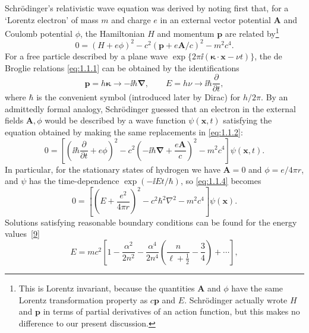 Schr\"odinger's relativistic wave equation was derived by noting first
that, for a `Lorentz electron' of mass $m$ and charge $e$ in an external vector
potential $\mathbf{A}$ and Coulomb potential $\phi$, the Hamiltonian $H$ and momentum
$\mathbf{p}$ are related by\footnote{This is Lorentz invariant, because the quantities $\mathbf{A}$ and $\phi$ have the same Lorentz transformation property as $c\mathbf{p}$ and $E$. Schr\"odinger actually wrote $H$ and $\mathbf{p}$ in terms of partial derivatives of an action function, but this makes no difference to our present discussion.}
\begin{equation}
  0=(H+e\phi)^2-c^2(\mathbf{p}+e\mathbf{A}/c)^2-m^2c^4.
  \tag{1.1.2}\label{eq:1.1.2}
\end{equation}
For a free particle described by a plane wave
$\exp\{2\pi \ii(\boldsymbol{\kappa}\cdot\mathbf{x}-\nu t)\}$, the de
Broglie relations \eqref{eq:1.1.1} can be obtained by the identifications
\begin{equation}
  \mathbf{p}=h\boldsymbol{\kappa}\longrightarrow-\ii\hbar\boldsymbol{\nabla},
  \qquad
  E=h\nu\longrightarrow \ii\hbar\frac{\partial}{\partial t},
  \tag{1.1.3}\label{eq:1.1.3}
\end{equation}
where $\hbar$ is the convenient symbol (introduced later by Dirac) for $h/2\pi$.
By an admittedly formal analogy, Schr\"odinger guessed that an electron
in the external fields $\mathbf{A},\phi$ would be described by a wave function $\psi(\mathbf{x},t)$
satisfying the equation obtained by making the same replacements in
\eqref{eq:1.1.2}:
\begin{equation}
  0=\left[\left(\ii\hbar\frac{\partial}{\partial t}+e\phi\right)^2
  -c^2\left(-\ii\hbar\boldsymbol{\nabla}+\frac{e\mathbf{A}}{c}\right)^2
  -m^2c^4\right]\psi(\mathbf{x},t).
  \tag{1.1.4}\label{eq:1.1.4}
\end{equation}
In particular, for the stationary states of hydrogen we have $\mathbf{A}=0$ and
$\phi=e/4\pi r$, and $\psi$ has the time-dependence $\exp(-\ii Et/\hbar)$, so \eqref{eq:1.1.4} becomes
\begin{equation}
  0=\left[\left(E+\frac{e^2}{4\pi r}\right)^2
  -c^2\hbar^2\nabla^2-m^2c^4\right]\psi(\mathbf{x}).
  \tag{1.1.5}\label{eq:1.1.5}
\end{equation}
Solutions satisfying reasonable boundary conditions can be found for the
energy values~\hyperref[ref:1.9]{[9]}
\begin{equation}
  E=mc^2\left[1-\frac{\alpha^2}{2n^2}
  -\frac{\alpha^4}{2n^4}\left(\frac{n}{\ell+\tfrac12}-\frac34\right)
  +\cdots\right],
  \tag{1.1.6}\label{eq:1.1.6}
\end{equation}
